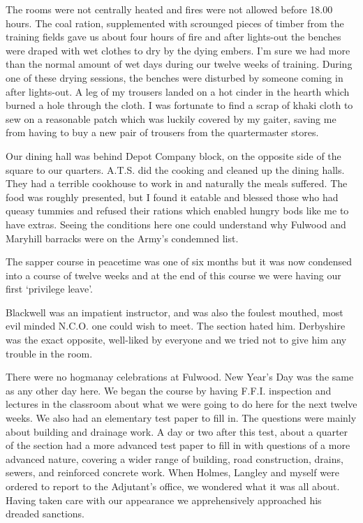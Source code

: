 The rooms were not centrally heated and fires were not allowed
before 18.00 hours. The coal ration, supplemented with scrounged
pieces of timber from the training fields gave us about four hours of
fire and after lights-out the benches were draped with wet clothes to
dry by the dying embers. I'm sure we had more than the normal amount
of wet days during our twelve weeks of training. During one of
these drying sessions, the benches were disturbed by someone coming
in after lights-out. A leg of my trousers landed on a hot cinder in
the hearth which burned a hole through the cloth. I was fortunate to
find a scrap of khaki cloth to sew on a reasonable patch which was
luckily covered by my gaiter, saving me from having to buy a new pair
of trousers from the quartermaster stores. 

Our dining hall was behind Depot Company block, on the opposite side
of the square to our quarters.  A.T.S. did the cooking and cleaned up
the dining halls. They had a terrible cookhouse to work in and
naturally the meals suffered. The food was roughly presented, but I
found it eatable and blessed those who had queasy tummies and refused
their rations which enabled hungry bods like me to have extras. Seeing
the conditions here one could understand why Fulwood and Maryhill
barracks were on the Army's condemned list.

The sapper course in peacetime was one of six months
but it was now condensed into a course of twelve weeks and at the
end of this course we were having our first `privilege leave'.


\Corporal Blackwell was an impatient instructor, and was also the
foulest mouthed, most evil minded N.C.O. one could wish to meet. The
section hated him. \Lcorporal Derbyshire was the exact opposite,
well-liked by everyone and we tried not to give him any trouble in the
room. 

There were no hogmanay celebrations at Fulwood. New Year's Day
was the same as any other day here. We began the course by having
F.F.I. inspection and lectures in the classroom about what we were
going to do here for the next twelve weeks. We also had an elementary
test paper to fill in. The questions were mainly about building and
drainage work. A day or two after this test, about a quarter of the
section had a more advanced test paper to fill in with questions of a
more advanced nature, covering a wider range of building, road
construction, drains, sewers, and reinforced concrete work. When
Holmes, Langley and myself were ordered to report to the Adjutant's
office, we wondered what it was all about. Having taken care with our
appearance we apprehensively approached his dreaded sanctions. 

